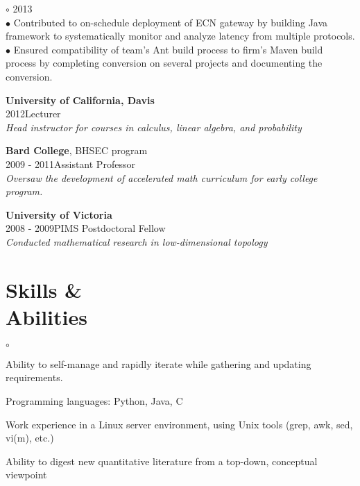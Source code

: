 \documentclass[margin]{res}
\newenvironment{list1}{
  \begin{list}{$\circ$}{
      \setlength{\itemsep}{0.0in}
      \setlength{\parsep}{0in} \setlength{\parskip}{0in}
      \setlength{\topsep}{0in} \setlength{\partopsep}{0in} 
      \setlength{\leftmargin}{0.1in}
      }}
      {\end{list}}
\begin{document}
\begin{resume}
\begin{list1}
2013 \\[0.05cm]
$\bullet$ Contributed to  on-schedule deployment of ECN gateway by building Java framework to systematically monitor and analyze latency from multiple protocols.\\[0.05cm]
$\bullet$ Ensured compatibility of team's Ant build process to firm's Maven build process by completing conversion on several projects and documenting the conversion.
\\[-0.3cm]
\item {\bf University of California, Davis}\\
2012\qquad Lecturer\\
{\it Head instructor for courses in calculus, linear algebra, and probability}\vspace{0.05cm}
\item {\bf Bard College}, BHSEC program\\
2009 - 2011\qquad Assistant Professor\\
{\it Oversaw the development of accelerated math curriculum for early college program.}\vspace{0.05cm}
\item {\bf University of Victoria}\\
2008 - 2009\qquad PIMS Postdoctoral Fellow\\
{\it Conducted mathematical research in low-dimensional topology}
\end{list1}
\vspace{-0.15in}

\section{\helv Skills \&\\ Abilities}
\begin{list1}
\item Ability to self-manage and rapidly iterate while gathering and updating requirements.
\item Programming languages: {\helv Python}, { \helv Java}, {\helv C}
\item Work experience in a Linux server environment, using Unix tools (grep, awk, sed, vi(m), etc.)
\item Ability to digest new quantitative literature from a top-down, conceptual viewpoint
\end{list1}

\vspace{-0.1in}


\end{resume}
\end{document}
